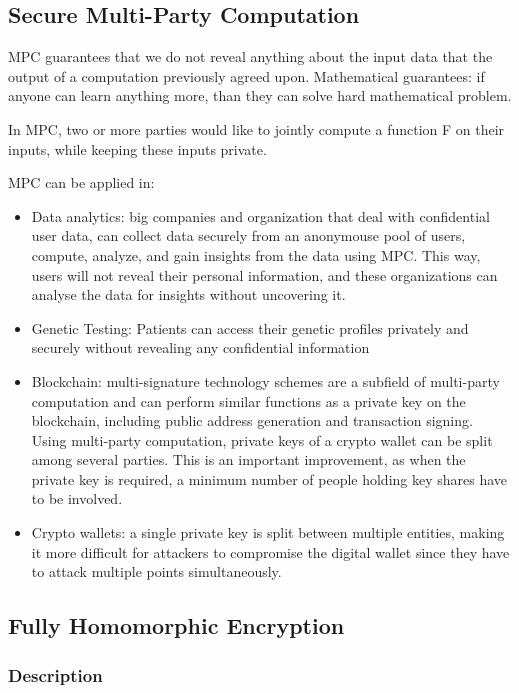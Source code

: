 \subsection{Secure Multi-Party Computation}

MPC guarantees that we do not reveal anything about the input data that the output of a computation previously agreed upon. 
Mathematical guarantees: if anyone can learn anything more, than they can solve hard mathematical problem. 

In MPC, two or more parties would like to jointly compute a function F on their inputs, while keeping these inputs private.\newline

MPC can be applied in:
\begin{itemize}
    \item Data analytics: big companies and organization that deal with confidential user data, can collect data securely from an anonymouse pool of users, compute, analyze, and gain insights from the data using MPC. This way, users will not reveal their personal information, and these organizations can analyse the data for insights without uncovering it. 
    \item Genetic Testing: Patients can access their genetic profiles privately and securely without revealing any confidential information
    \item Blockchain: multi-signature technology schemes are a subfield of multi-party computation and can perform similar functions as a private key on the blockchain, including public address generation and transaction signing. Using multi-party computation, private keys of a crypto wallet can be split among several parties. This is an important improvement, as when the private key is required, a minimum number of people holding key shares have to be involved. 
    \item Crypto wallets: a single private key is split between multiple entities, making it more difficult for attackers to compromise the digital wallet since they have to attack multiple points simultaneously.
\end{itemize}

\subsection{Fully Homomorphic Encryption}

\subsubsection{Description}

